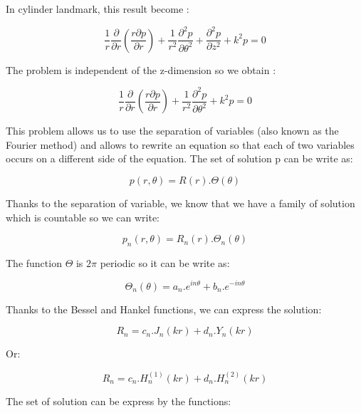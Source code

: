 In cylinder landmark, this result become :

\begin{equation}
 \frac{1}{r}\frac{\partial}{\partial r}(
 \frac{ r \partial p}{\partial r}) + \frac{1}{r^2}\frac{\partial^2 p}{\partial \theta^2} + \frac{\partial^2 p}{\partial z^2} + k^2 p = 0 
\end{equation}

The problem is independent of the z-dimension so we obtain :

\begin{equation}
 \frac{1}{r}\frac{\partial}{\partial r}(
 \frac{ r \partial p}{\partial r}) + \frac{1}{r^2}\frac{\partial^2 p}{\partial \theta^2} + k^2 p = 0 
\end{equation}

This problem allows us to use the separation of variables (also known as the Fourier method) and allows to rewrite an equation so that each of two variables occurs on a different side of the equation. The set of solution p can be write as:

\begin{equation}
 p(r,\theta) = R(r).\Theta(\theta)
\end{equation}

Thanks to the separation of variable, we know that we have a family of solution which is countable so we can write:

\begin{equation}
p_{n}(r,\theta) = R_{n}(r).\Theta_{n}(\theta)
\end{equation}

The function $\Theta$ is $2\pi$ periodic so it can be write as:

\begin{equation}
\Theta_{n}(\theta) = a_{n}.e^{in\theta} + b_{n}.e^{-in\theta}
\end{equation}

Thanks to the Bessel and Hankel functions, we can express the solution:

\begin{equation}
R_{n} = c_{n}.J_{n}(kr) + d_{n}.Y_{n}(kr)
\end{equation}

Or:

\begin{equation}
R_{n} = c_{n}.H^{(1)}_{n}(kr) + d_{n}.H^{(2)}_{n}(kr)
\end{equation}

The set of solution can be express by the functions:

